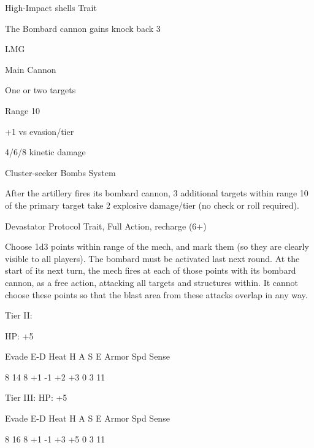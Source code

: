 High-Impact shells
Trait

The Bombard cannon gains knock back 3


LMG

Main Cannon

One or two targets

Range 10

+1 vs evasion/tier

4/6/8 kinetic damage


Cluster-seeker Bombs
System

After the artillery fires its bombard cannon, 3 additional targets within range 10 of the primary
target take 2 explosive damage/tier (no check or roll required).


Devastator Protocol
Trait, Full Action, recharge (6+)

Choose 1d3 points within range of the mech, and mark them (so they are clearly visible to all
players). The bombard must be activated last next round. At the start of its next turn, the mech
fires at each of those points with its bombard cannon, as a free action, attacking all targets and
structures within. It cannot choose these points so that the blast area from these attacks overlap
in any way.


Tier II:

HP: +5


          Evade    E-D    Heat     H    A     S     E       Armor        Spd      Sense

          8        14     8        +1   -1    +2    +3      0            3        11

Tier III:
HP: +5


          Evade    E-D    Heat     H    A     S     E       Armor        Spd      Sense

          8        16     8        +1   -1    +3    +5      0            3        11
